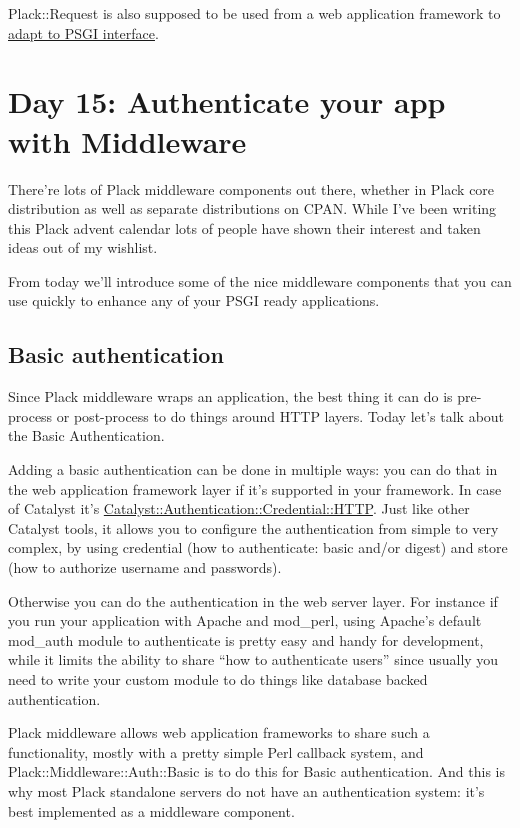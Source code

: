 Plack::Request is also supposed to be used from a web application
framework to
\href{http://advent.plackperl.org/2009/12/day-8-adapting-web-frameworks-to-psgi.html}{adapt
to PSGI interface}.

\section{Day 15: Authenticate your app with
Middleware}\label{day-15-authenticate-your-app-with-middleware}

There're lots of Plack middleware components out there, whether in Plack
core distribution as well as separate distributions on CPAN. While I've
been writing this Plack advent calendar lots of people have shown their
interest and taken ideas out of my wishlist.

From today we'll introduce some of the nice middleware components that
you can use quickly to enhance any of your PSGI ready applications.

\subsection{Basic authentication}\label{basic-authentication}

Since Plack middleware wraps an application, the best thing it can do is
pre-process or post-process to do things around HTTP layers. Today let's
talk about the Basic Authentication.

Adding a basic authentication can be done in multiple ways: you can do
that in the web application framework layer if it's supported in your
framework. In case of Catalyst it's
\href{http://search.cpan.org/perldoc?Catalyst::Authentication::Credential::HTTP}{Catalyst::Authentication::Credential::HTTP}.
Just like other Catalyst tools, it allows you to configure the
authentication from simple to very complex, by using credential (how to
authenticate: basic and/or digest) and store (how to authorize username
and passwords).

Otherwise you can do the authentication in the web server layer. For
instance if you run your application with Apache and mod\_perl, using
Apache's default mod\_auth module to authenticate is pretty easy and
handy for development, while it limits the ability to share ``how to
authenticate users'' since usually you need to write your custom module
to do things like database backed authentication.

Plack middleware allows web application frameworks to share such a
functionality, mostly with a pretty simple Perl callback system, and
Plack::Middleware::Auth::Basic is to do this for Basic authentication.
And this is why most Plack standalone servers do not have an
authentication system: it's best implemented as a middleware component.

